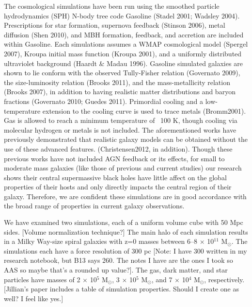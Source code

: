 \documentclass[manuscript]{aastex}
\begin{document}
	The cosmological simulations have been run using the smoothed particle hydrodynamics (SPH) N-body tree code Gasoline (Stadel 2001; Wadsley 2004). \citep{Wadsley2004} Prescriptions for star formation, supernova feedback (Stinson 2006), metal diffusion (Shen 2010), and MBH formation, feedback, and accretion \citep{Bellovary2010} are included within Gasoline. Each simulations assumes a WMAP cosmological model (Spergel 2007), Kroupa initial mass function (Kroupa 2001), and a uniformly distributed ultraviolet background (Haardt \& Madau 1996). Gasoline simulated galaxies are shown to lie conform with the observed Tully-Fisher relation (Governato 2009), the size-luminosity relation (Brooks 2011), and the mass-metallicity relation (Brooks 2007), in addition to having realistic matter distributions and baryon fractions (Governato 2010; Guedes 2011). Primordial cooling and a low-temperature extension to the cooling curve is used to trace metals (Bromm2001). Gas is allowed to reach a minimum temperature of ~100 K, though cooling via molecular hydrogen or metals is not included. The aforementioned works have previously demonstrated that realistic galaxy models can be obtained without the use of these advanced features. (Christensen2012, in addition). Though these previous works have not included AGN feedback or its effects, for small to moderate mass galaxies (like those of previous and current studies) our research shows their central supermassive black holes have little affect on the global properties of their hosts and only directly impacts the central region of their galaxy. Therefore, we are confident these simulations are in good accordance with the broad range of properties in current galaxy observations.

	We have examined two simulations, each of a uniform volume cube with 50 Mpc sides. [Volume normalization technique?] The main halo of each simulation results in a Milky Way-size spiral galaxies with z=0 masses between 6--8 $\times$ 10$^{11}$  M$_{\odot}$. The simulations each have a force resolution of 300 pc [Note: I have 300 written in my research notebook, but B13 says 260. The notes I have are the ones I took so AAS so maybe that's a rounded up value?]. The gas, dark matter, and star particles have masses of 2 $\times$ 10$^5$ M$_{\odot}$, 3 $\times$ 10$^5$ M$_{\odot}$, and 7 $\times$ 10$^4$ M$_{\odot}$, respectively.  [Jillian's paper includes a table of simulation properties. Should I create one as well? I feel like yes.] 
\end{document}
